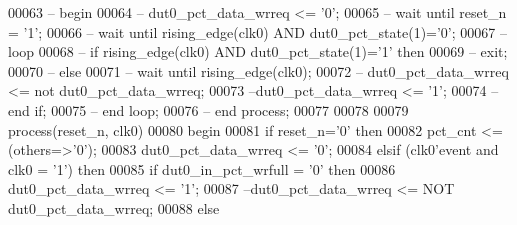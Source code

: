 \begin{DoxyCode}
00063 \textcolor{keyword}{    -- begin}
00064 \textcolor{keyword}{      -- dut0\_pct\_data\_wrreq <= '0';}
00065 \textcolor{keyword}{      -- wait until reset\_n = '1';}
00066 \textcolor{keyword}{      -- wait until rising\_edge(clk0) AND dut0\_pct\_state(1)='0';}
00067 \textcolor{keyword}{      -- loop}
00068 \textcolor{keyword}{         -- if rising\_edge(clk0) AND dut0\_pct\_state(1)='1' then }
00069 \textcolor{keyword}{            -- exit;}
00070 \textcolor{keyword}{         -- else }
00071 \textcolor{keyword}{            -- wait until rising\_edge(clk0);}
00072 \textcolor{keyword}{            -- dut0\_pct\_data\_wrreq <= not dut0\_pct\_data\_wrreq;}
00073 \textcolor{keyword}{            --dut0\_pct\_data\_wrreq <=  '1';}
00074 \textcolor{keyword}{         -- end if;}
00075 \textcolor{keyword}{      -- end loop;}
00076 \textcolor{keyword}{    -- end process;}
00077     
00078     
00079      \textcolor{keywordflow}{process}(reset_n, clk0)
00080 \textcolor{vhdlkeyword}{    begin}
00081       \textcolor{keywordflow}{if} \textcolor{vhdlchar}{reset_n}\textcolor{vhdlchar}{=}\textcolor{vhdlchar}{'}\textcolor{vhdllogic}{}\textcolor{vhdllogic}{0}\textcolor{vhdlchar}{'} \textcolor{keywordflow}{then}
00082          \textcolor{vhdlchar}{pct_cnt} \textcolor{vhdlchar}{<=} \textcolor{vhdlchar}{(}\textcolor{keywordflow}{others}\textcolor{vhdlchar}{=}\textcolor{vhdlchar}{>}\textcolor{vhdlchar}{'}\textcolor{vhdllogic}{}\textcolor{vhdllogic}{0}\textcolor{vhdlchar}{'}\textcolor{vhdlchar}{)};
00083          \textcolor{vhdlchar}{dut0_pct_data_wrreq} \textcolor{vhdlchar}{<=} \textcolor{vhdlchar}{'}\textcolor{vhdllogic}{}\textcolor{vhdllogic}{0}\textcolor{vhdlchar}{'};        
00084       \textcolor{keywordflow}{elsif} \textcolor{vhdlchar}{(}\textcolor{vhdlchar}{clk0}\textcolor{vhdlchar}{'}\textcolor{vhdlkeyword}{event} \textcolor{keywordflow}{and} \textcolor{vhdlchar}{clk0} \textcolor{vhdlchar}{=} \textcolor{vhdlchar}{'}\textcolor{vhdllogic}{}\textcolor{vhdllogic}{1}\textcolor{vhdlchar}{'}\textcolor{vhdlchar}{)} \textcolor{keywordflow}{then}
00085          \textcolor{keywordflow}{if} \textcolor{vhdlchar}{dut0_in_pct_wrfull} \textcolor{vhdlchar}{=} \textcolor{vhdlchar}{'}\textcolor{vhdllogic}{}\textcolor{vhdllogic}{0}\textcolor{vhdlchar}{'} \textcolor{keywordflow}{then} 
00086             \textcolor{vhdlchar}{dut0_pct_data_wrreq} \textcolor{vhdlchar}{<=} \textcolor{vhdlchar}{'}\textcolor{vhdllogic}{}\textcolor{vhdllogic}{1}\textcolor{vhdlchar}{'};
00087 \textcolor{keyword}{            --dut0\_pct\_data\_wrreq <= NOT dut0\_pct\_data\_wrreq;}
00088          \textcolor{keywordflow}{else} 

\end{DoxyCode}
